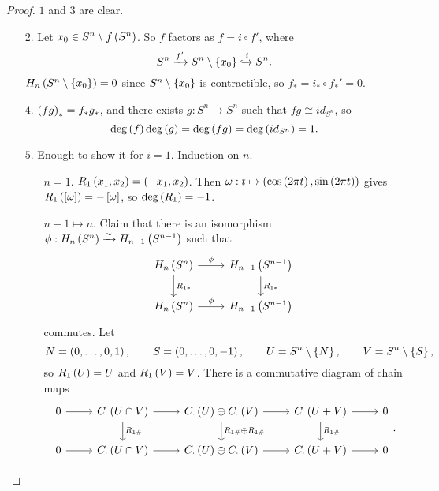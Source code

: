 \begin{proof}
$ 1 $ and $ 3 $ are clear.
\begin{itemize}
\item[$ 2 $.] Let $ x_0 \in S^n \setminus f\left( S^n \right) $. So $ f $ factors as $ f = i \circ f' $, where
$$ S^n \xrightarrow{f'} S^n \setminus \left\{ x_0 \right\} \xhookrightarrow{i} S^n. $$
$ H_n\left( S^n \setminus \left\{ x_0 \right\} \right) = 0 $ since $ S^n \setminus \left\{ x_0 \right\} $ is contractible, so $ f_* = i_* \circ f_*' = 0 $.
\item[$ 4 $.] $ \left( fg \right)_* = f_*g_* $, and there exists $ g : S^n \to S^n $ such that $ fg \cong id_{S^n} $, so
$$ \deg\left( f \right)\deg\left( g \right) = \deg\left( fg \right) = \deg\left( id_{S^n} \right) = 1. $$
\item[$ 5 $.] Enough to show it for $ i = 1 $. Induction on $ n $.
\begin{itemize}[leftmargin=2cm]
\item[$ n = 1 $.] $ R_1\left( x_1, x_2 \right) = \left( -x_1, x_2 \right) $. Then $ \omega : t \mapsto \left( \cos\left( 2\pi t \right), \sin\left( 2\pi t \right) \right) $ gives $ R_1\left( \left[ \omega \right] \right) = -\left[ \omega \right] $, so $ \deg\left( R_1 \right) = -1 $.
\item[$ n - 1 \mapsto n $.] Claim that there is an isomorphism $ \phi : H_n\left( S^n \right) \xrightarrow{\sim} H_{n - 1}\left( S^{n - 1} \right) $ such that
$$
\begin{tikzcd}
H_n\rb{S^n} \arrow{r}{\phi} \arrow{d}{R_{1*}} & H_{n - 1}\rb{S^{n - 1}} \arrow{d}{R_{1*}} \\
H_n\rb{S^n} \arrow{r}{\phi} & H_{n - 1}\rb{S^{n - 1}}
\end{tikzcd}
$$
commutes. Let
$$ N = \left( 0, \dots, 0, 1 \right), \qquad S = \left( 0, \dots, 0, -1 \right), \qquad U = S^n \setminus \left\{ N \right\}, \qquad V = S^n \setminus \left\{ S \right\}, $$
so $ R_1\left( U \right) = U $ and $ R_1\left( V \right) = V $. There is a commutative diagram of chain maps
$$
\begin{tikzcd}
0 \arrow{r} & C_\cdot\rb{U \cap V} \arrow{r} \arrow{d}{R_{1\#}} & C_\cdot\rb{U} \oplus C_\cdot\rb{V} \arrow{r} \arrow{d}{R_{1\#} \oplus R_{1\#}} & C_\cdot\rb{U + V} \arrow{r} \arrow{d}{R_{1\#}} & 0 \\
0 \arrow{r} & C_\cdot\rb{U \cap V} \arrow{r} & C_\cdot\rb{U} \oplus C_\cdot\rb{V} \arrow{r} & C_\cdot\rb{U + V} \arrow{r} & 0
\end{tikzcd}.
$$

\pagebreak


\end{itemize}
\end{itemize}
\end{proof}
